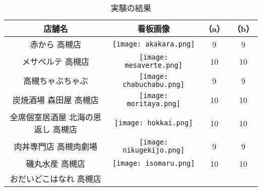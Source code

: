   \begin{table}[t]
    \caption{実験の結果}
    \label{table:recog_result}
    \begin{center}
      \begin{tabular}{cc|cc}
        \hline\hline
        店舗名 & 看板画像 & （a） & （b） \\ \hline
        赤から 高槻店 & 
        \begin{minipage}{40mm}
          \centering
          \texttt{[image: akakara.png]}
        \end{minipage} & 9 & 9 \\
        メサベルテ 高槻店 & 
        \begin{minipage}{40mm}
          \centering
          \texttt{[image: mesaverte.png]}
        \end{minipage} & 10 & 10 \\
        高槻ちゃぶちゃぶ & 
        \begin{minipage}{40mm}
          \centering
          \texttt{[image: chabuchabu.png]}
        \end{minipage} & 9 & 9 \\
        炭焼酒場 森田屋 高槻店 & 
        \begin{minipage}{40mm}
          \centering
          \texttt{[image: moritaya.png]}
        \end{minipage} & 10 & 10 \\
        全席個室居酒屋 北海の恩返し 高槻店 & 
        \begin{minipage}{40mm}
          \centering
          \texttt{[image: hokkai.png]}
        \end{minipage} & 10 & 10 \\
        肉丼専門店 高槻肉劇場 & 
        \begin{minipage}{40mm}
          \centering
          \texttt{[image: nikugekijo.png]}
        \end{minipage} & 9 & 9 \\
        磯丸水産 高槻店 & 
        \begin{minipage}{40mm}
          \centering
          \texttt{[image: isomaru.png]}
        \end{minipage} & 10 & 10 \\
        おだいどこはなれ 高槻店 & 
        \begin{minipage}{40mm}
          \centering

\end{minipage}
\end{tabular}
\end{center}
\end{table}
